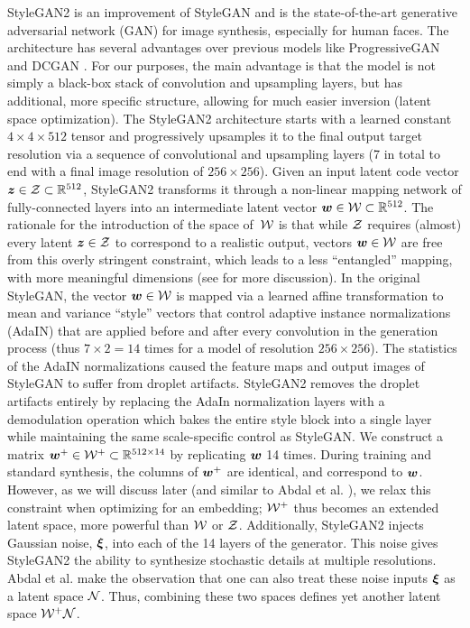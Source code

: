 StyleGAN2 \cite{StyleGAN2} is an improvement of StyleGAN \cite{StyleGAN} and is the state-of-the-art generative adversarial network (GAN) for image synthesis, especially for human faces.
The architecture has several advantages over previous models like ProgressiveGAN \cite{Karras2018} and DCGAN \cite{DCGAN}. For our purposes, the main advantage is that the model is not simply a black-box stack of convolution and upsampling layers, but has additional, more specific structure, allowing for much easier inversion (latent space optimization).
The StyleGAN2 architecture starts with a learned constant $4 \times 4 \times 512$ tensor and progressively upsamples it to the final output target resolution via a sequence of convolutional and upsampling layers (7 in total to end with a final image resolution of $256 \times 256$).
Given an input latent code vector $\bm{z} \in \mathcal{Z} \subset \mathbb{R}^{512}$, StyleGAN2 transforms it through a non-linear mapping network of fully-connected layers into an intermediate latent vector $\bm{w} \in \mathcal{W} \subset \mathbb{R}^{512}$.
The rationale for the introduction of the space of~$\mathcal{W}$ is that while $\mathcal{Z}$ requires (almost) every latent $\bm{z} \in \mathcal{Z}$ to correspond to a realistic output, vectors $\bm{w} \in \mathcal{W}$ are free from this overly stringent constraint, which leads to a less ``entangled'' mapping, with more meaningful dimensions (see \cite{StyleGAN,StyleGAN2} for more discussion).
In the original StyleGAN, the vector $\bm{w} \in \mathcal{W}$ is mapped via a learned affine transformation to mean and variance ``style'' vectors that control adaptive instance normalizations (AdaIN) \cite{Huang2017} that are applied before and after every convolution in the generation process (thus $7 \times 2 = 14$ times for a model of resolution $256 \times 256$). The statistics of the AdaIN normalizations caused the feature maps and output images of StyleGAN to suffer from droplet artifacts. StyleGAN2 removes the droplet artifacts entirely by replacing the AdaIn normalization layers with a demodulation operation which bakes the entire style block into a single layer while maintaining the same scale-specific control as StyleGAN.
We construct a matrix $\bm{w}^+ \in \mathcal{W}^+ \subset \mathbb{R}^{512 \times 14}$ by replicating $\bm{w}$ 14 times.
During training and standard synthesis, the columns of $\bm{w}^+$ are identical, and correspond to $\bm{w}$.
However, as we will discuss later (and similar to Abdal et al. \cite{Abdal19a}), we relax this constraint when optimizing for an embedding; $\mathcal{W}^+$ thus becomes an extended latent space, more powerful than $\mathcal{W}$ or $\mathcal{Z}$.
Additionally, StyleGAN2 injects Gaussian noise, $\bm{\xi}$, into each of the 14 layers of the generator.
This noise gives StyleGAN2 the ability to synthesize stochastic details at multiple resolutions.
Abdal et al. \cite{Abdal19b} make the observation that one can also treat these noise inputs $\bm{\xi}$ as a latent space $\mathcal{N}$. Thus, combining these two spaces defines yet another latent space $\mathcal{W}^+\mathcal{N}$.


